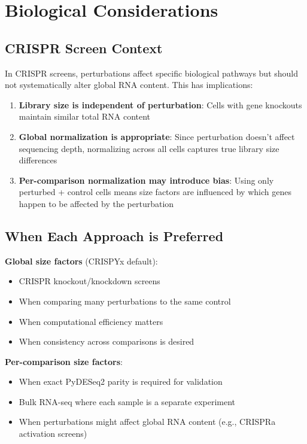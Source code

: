 \documentclass[11pt]{article}
\begin{document}
\section{Biological Considerations}

\subsection{CRISPR Screen Context}

In CRISPR screens, perturbations affect specific biological pathways but should not systematically alter global RNA content. This has implications:

\begin{enumerate}
    \item \textbf{Library size is independent of perturbation}: Cells with gene knockouts maintain similar total RNA content
    \item \textbf{Global normalization is appropriate}: Since perturbation doesn't affect sequencing depth, normalizing across all cells captures true library size differences
    \item \textbf{Per-comparison normalization may introduce bias}: Using only perturbed + control cells means size factors are influenced by which genes happen to be affected by the perturbation
\end{enumerate}

\subsection{When Each Approach is Preferred}

\textbf{Global size factors} (CRISPYx default):
\begin{itemize}
    \item CRISPR knockout/knockdown screens
    \item When comparing many perturbations to the same control
    \item When computational efficiency matters
    \item When consistency across comparisons is desired
\end{itemize}

\textbf{Per-comparison size factors}:
\begin{itemize}
    \item When exact PyDESeq2 parity is required for validation
    \item Bulk RNA-seq where each sample is a separate experiment
    \item When perturbations might affect global RNA content (e.g., CRISPRa activation screens)
\end{itemize}
\end{document}
